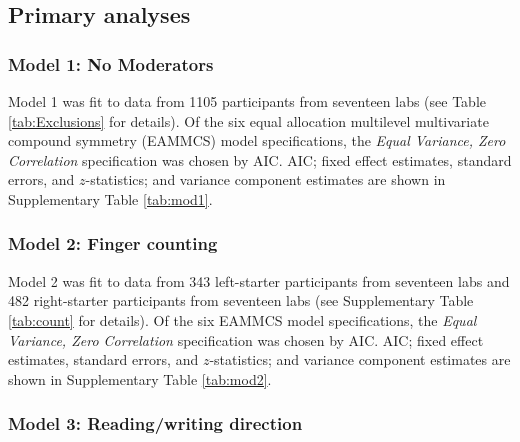 \documentclass[A4paper,man,floatsintext]{apa6}
\theoremstyle{definition}
\theoremstyle{definition}
\theoremstyle{definition}
\theoremstyle{remark}
\begin{document}
\printbibliography[title=References]

\clearpage
\makeatletter
\efloat@restorefloats
\makeatother


\begin{appendix}
\section{}
\renewcommand{\thetable}{S\arabic{table}}
\renewcommand{\thefigure}{S\arabic{figure}}

 \setcounter{page}{0}

\subsection{Primary analyses}\label{primary-analyses}

\subsubsection{Model 1: No Moderators}\label{model-1-no-moderators}

Model 1 was fit to data from 1105 participants from seventeen labs (see
Table \ref{tab:Exclusions} for details). Of the six equal allocation
multilevel multivariate compound symmetry (EAMMCS) model specifications,
the \emph{Equal Variance, Zero Correlation} specification was chosen by
AIC. AIC; fixed effect estimates, standard errors, and \(z\)-statistics;
and variance component estimates are shown in Supplementary Table
\ref{tab:mod1}.

\subsubsection{Model 2: Finger counting}\label{model-2-finger-counting}

Model 2 was fit to data from 343 left-starter participants from
seventeen labs and 482 right-starter participants from seventeen labs
(see Supplementary Table \ref{tab:count} for details). Of the six EAMMCS
model specifications, the \emph{Equal Variance, Zero Correlation}
specification was chosen by AIC. AIC; fixed effect estimates, standard
errors, and \(z\)-statistics; and variance component estimates are shown
in Supplementary Table \ref{tab:mod2}.

\subsubsection{Model 3: Reading/writing
direction}\label{model-3-readingwriting-direction}


\end{appendix}
\end{document}
